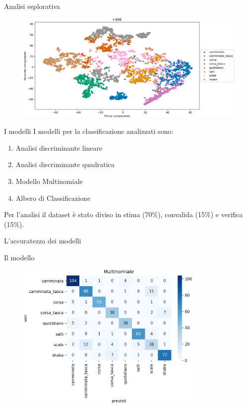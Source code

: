 \documentclass{beamer}
\begin{document}
\begin{frame}{Analisi esplorativa}
\begin{figure}[H]
\includegraphics[width=\textwidth]{../figure/t-SNE.png}
\end{figure}
\end{frame}

\begin{frame}{I modelli}
I modelli per la classificazione analizzati sono: 
\begin{enumerate}
\item Analisi discriminante lineare
\item Analisi discriminante quadratica
\item Modello Multinomiale
\item Albero di Classificazione
\end{enumerate}

Per l'analisi il dataset è stato diviso in stima (70\%), convalida (15\%) e verifica (15\%). 
\end{frame}

\begin{frame}{L'accuratezza dei modelli}

\end{frame}


\begin{frame}{Il modello}
\begin{figure}[H]
\includegraphics[width=0.8\textwidth]{../figure/confusionMatrix-Mn.png}
\end{figure}
\end{frame}
\end{document}
